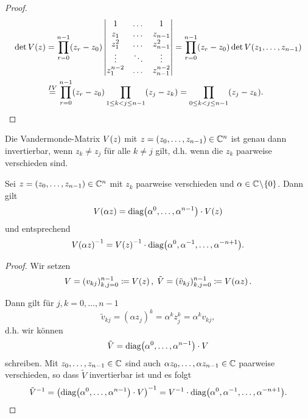 \begin{proof}
    \[
        \begin{split}
            \det{V \! \left( z \right)}
            &= \prod_{r=0}^{n-1} (z_r - z_0) \begin{vmatrix}
                1         & \dots & 1 \\
                z_1       & \dots & z_{n-1} \\
                z_1^2     & \dots & z_{n-1}^2 \\
                \vdots    & \ddots & \vdots \\
                z_1^{n-2} & \dots & z_{n-1}^{n-2}
            \end{vmatrix}
            = \prod_{r=0}^{n-1} (z_r - z_0) \det{V \! \left( z_1, \dots, z_{n-1} \right)}\\
            &\overset{IV}{=}
                \prod_{r=0}^{n-1} (z_r - z_0) \prod_{1 \leq k < j \leq n-1} (z_j - z_k)
            = \prod_{0 \leq k < j \leq n-1} (z_j - z_k).
        \end{split}
    \]
\end{proof}

\begin{corollary}
    Die Vandermonde-Matrix $V \! \left( z \right)$ mit
    $z = (z_0, \dots, z_{n-1}) \in \mathbb{C}^n$ ist genau dann invertierbar, wenn
    $z_k \neq z_j$ für alle $k \neq j$ gilt, d.h. wenn die $z_k$ paarweise
    verschieden sind.
\end{corollary}

\begin{lemma}
    \label{lemma:vandermonde_const_multiplication}
    Sei $z = (z_0, \dots, z_{n-1}) \in \mathbb{C}^n$ mit $z_k$ paarweise verschieden und
    $\alpha \in \mathbb{C} \! \setminus \! \{0\}$.
    Dann gilt
    \begin{equation}
        \label{eq:vandermonde_const_multiplication}
        V \! \left( \alpha z \right)
        = \text{diag$ \left( \alpha^0, \dots, \alpha^{n-1} \right)$} \cdot V \! \left( z \right)
    \end{equation}
    und entsprechend
    \begin{equation}
        \label{eq:inverse_vandermonde_const_multiplication}
        V \! \left( \alpha z \right)^{-1}
        = V \! \left( z \right)^{-1} \cdot \text{diag$ \left( \alpha^0, \alpha^{-1}, \dots, \alpha^{-n+1} \right)$}.
    \end{equation}
\end{lemma}
\begin{proof}
    Wir setzen
    \[
        V = (v_{kj})_{k,j=0}^{n-1} \coloneqq V \! \left( z \right), \;
        \tilde{V} = (\tilde{v}_{kj})_{k,j=0}^{n-1} \coloneqq V \! \left( \alpha z \right).
    \]

    \noindent Dann gilt für $j,k = 0,\dots,n-1$
    \[
        \tilde{v}_{kj} = (\alpha z_j)^k = \alpha^k z_j^k = \alpha^k v_{kj},
    \]
    d.h. wir können
    \[
        \tilde{V} = \text{diag$ \left( \alpha^0, \dots, \alpha^{n-1} \right)$} \cdot V
    \]
    schreiben.
    Mit $z_0, \dots, z_{n-1} \in \mathbb{C}$ sind auch
    $\alpha z_0, \dots, \alpha z_{n-1} \in \mathbb{C}$
    paarweise verschieden, so dass $\tilde{V}$ invertierbar ist und es folgt
    \[
        \tilde{V}^{-1}
        = \left( \text{diag$ \left( \alpha^0, \dots, \alpha^{n-1} \right)$} \cdot V \right)^{-1}
        = V^{-1} \cdot \text{diag$ \left( \alpha^0, \alpha^{-1}, \dots, \alpha^{-n+1} \right)$}.
    \]
\end{proof}

